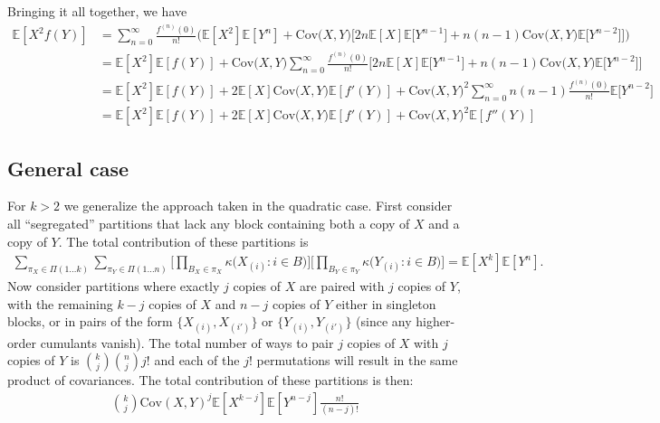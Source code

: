 \documentclass{article}
\theoremstyle{plain}
\theoremstyle{definition}
\theoremstyle{remark}
\newcommand{\E}{\mathbb{E}}
\begin{document}
Bringing it all together, we have
\begin{align}
    \E[X^2 f(Y)] &= \sum_{n = 0}^{\infty} \frac{f^{(n)}(0)}{n!} \Big ( \E[X^2] \E[Y^n] + \mathrm{Cov} \big ( X, Y \big ) \big [ 2n \E[X] \E \big [ Y^{n - 1} \big ] +  n(n - 1) \mathrm{Cov} \big ( X, Y \big ) \E \big [ Y^{n - 2} \big ] \big ] \Big ) \\
    &= \E[X^2] \E[f(Y)] + \mathrm{Cov} \big ( X, Y \big ) \sum_{n = 0}^{\infty} \frac{f^{(n)}(0)}{n!} \big [ 2n \E[X] \E \big [ Y^{n - 1} \big ] +  n(n - 1) \mathrm{Cov} \big ( X, Y \big ) \E \big [ Y^{n - 2} \big ] \big ] \\
    &= \E[X^2] \E[f(Y)] + 2 \E[X] \mathrm{Cov} \big ( X, Y \big ) \E[f'(Y)] + \mathrm{Cov} \big ( X, Y \big )^2 \sum_{n = 0}^{\infty} n(n - 1) \frac{f^{(n)}(0)}{n!} \E \big [ Y^{n - 2} \big ] \\
    &= \E[X^2] \E[f(Y)] + 2 \E[X] \mathrm{Cov} \big ( X, Y \big ) \E[f'(Y)] + \mathrm{Cov} \big ( X, Y \big )^2 \E[f''(Y)]
\end{align}

\subsection{General case}

For $k > 2$ we generalize the approach taken in the quadratic case. First consider all ``segregated'' partitions that lack any block containing both a copy of $X$ and a copy of $Y$. The total contribution of these partitions is
\begin{align}
    \sum_{\pi_X \in \Pi(1 \ldots k)} \sum_{\pi_Y \in \Pi(1 \ldots n)} \Big [ \prod_{B_X \in \pi_X} \kappa \big ( X_{(i)} : i \in B \big ) \Big ] \Big [ \prod_{B_Y \in \pi_Y} \kappa \big ( Y_{(i)} : i \in B \big ) \Big ] = \E[X^k] \E[Y^n].
\end{align}
Now consider partitions where exactly $j$ copies of $X$ are paired with $j$ copies of $Y$, with the remaining $k - j$ copies of $X$ and $n - j$ copies of $Y$ either in singleton blocks, or in pairs of the form $\{ X_{(i)}, X_{(i')} \}$ or $\{ Y_{(i)}, Y_{(i')} \}$  (since any higher-order cumulants vanish). The total number of ways to pair $j$ copies of $X$ with $j$ copies of $Y$ is $\binom{k}{j} \binom{n}{j} j!$ and each of the $j!$ permutations will result in the same product of covariances. The total contribution of these partitions is then:
\begin{align}
    \binom{k}{j} \mathrm{Cov}(X, Y)^j \E[X^{k - j}] \E[Y^{n - j}] \frac{n!}{(n - j)!}
\end{align}
\end{document}
